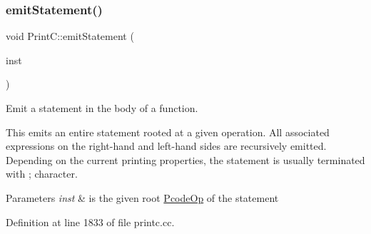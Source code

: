 \subsubsection{\texorpdfstring{emitStatement()}{emitStatement()}}
{\footnotesize\ttfamily void Print\+C\+::emit\+Statement (\begin{DoxyParamCaption}\item[{const \mbox{\hyperlink{class_pcode_op}{Pcode\+Op}} $\ast$}]{inst }\end{DoxyParamCaption})\hspace{0.3cm}{\ttfamily [protected]}}



Emit a statement in the body of a function. 

This emits an entire statement rooted at a given operation. All associated expressions on the right-\/hand and left-\/hand sides are recursively emitted. Depending on the current printing properties, the statement is usually terminated with \textquotesingle{};\textquotesingle{} character. 
\begin{DoxyParams}{Parameters}
{\em inst} & is the given root \mbox{\hyperlink{class_pcode_op}{Pcode\+Op}} of the statement \\
\hline
\end{DoxyParams}


Definition at line 1833 of file printc.\+cc.

